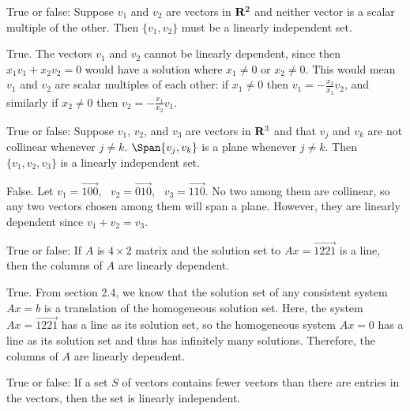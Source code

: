 \begin{problems}
\problem %
True or false: Suppose $v_1$ and $v_2$ are vectors in ${\bf R}^2$ 
and neither vector is a scalar multiple of the other.  Then 
$\{v_1, v_2\}$ must be a linearly independent set. %

\begin{solution}
True.  The vectors $v_1$ and $v_2$ cannot be
      linearly dependent, since then $x_1 v_1 + x_2 v_2 = 0$ would
      have a solution where $x_1 \neq 0$ or $x_2 \neq 0$.  This would
      mean $v_1$ and $v_2$ are scalar multiples of each other: if
      $x_1 \neq 0$ then $v_1 = - \frac{x_2}{x_1} v_2$, and similarly
      if $x_2 \neq 0$ then $v_2 = -\frac{x_1}{x_2} v_1$.  %
\end{solution}

\problem %
True or false: %
Suppose $v_1$, $v_2$, and $v_3$ are vectors in ${\bf R}^3$ and 
that $v_j$ and $v_k$ are not collinear whenever $j \neq k$. 
$\Span\{v_j, v_k\}$ is a plane whenever $j \neq k$.  Then 
$\{v_1, v_2, v_3\}$ is a linearly independent set.  %

\begin{solution}
False.  Let $v_1 = \vec{1 0 0}$, \ $v_2 = \vec{0 1 0}$, \ 
$v_3 = \vec{1 1 0}$.  No two among them are collinear, so any two vectors 
chosen among them will span a plane.  However, they are linearly dependent 
since $v_1 + v_2 = v_3$.  %
\end{solution}

\problem %
True or false: %
If $A$ is $4 \times 2$ matrix and the solution set to $Ax=\vec{1 2 2 1}$ 
is a line, then the columns of $A$ are linearly dependent. %

\begin{solution}
True.  From section 2.4, we know that the solution set of any consistent 
system $Ax=b$ is a translation of the homogeneous solution set.  Here, the 
system $Ax=\vec{1 2 2 1}$ has a line as its solution set, so the
homogeneous system $Ax=0$ has a line as its solution set and
thus has infinitely many solutions.  Therefore, the columns of $A$ are 
linearly dependent.   
\end{solution}

\problem %
True or false: %
If a set $S$ of vectors contains fewer vectors than there are entries in 
the vectors, then the set is linearly independent. %


\end{problems}
